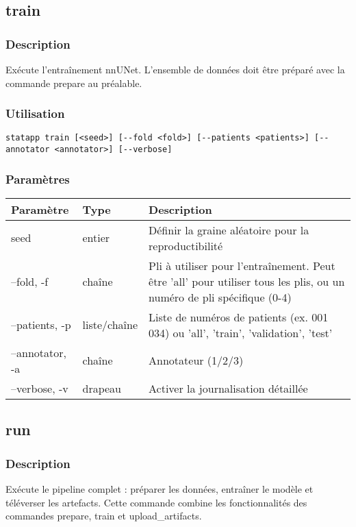 \documentclass{article}
\begin{document}
\subsection{train}
\subsubsection{Description}
Exécute l'entraînement nnUNet. L'ensemble de données doit être préparé avec la commande prepare au préalable.

\subsubsection{Utilisation}
\begin{lstlisting}
statapp train [<seed>] [--fold <fold>] [--patients <patients>] [--annotator <annotator>] [--verbose]
\end{lstlisting}

\subsubsection{Paramètres}
\begin{tabulary}{\linewidth}{LLL}
\toprule
\textbf{Paramètre} & \textbf{Type} & \textbf{Description} \\
\midrule
seed & entier & Définir la graine aléatoire pour la reproductibilité \\
--fold, -f & chaîne & Pli à utiliser pour l'entraînement. Peut être 'all' pour utiliser tous les plis, ou un numéro de pli spécifique (0-4) \\
--patients, -p & liste/chaîne & Liste de numéros de patients (ex. 001 034) ou 'all', 'train', 'validation', 'test' \\
--annotator, -a & chaîne & Annotateur (1/2/3) \\
--verbose, -v & drapeau & Activer la journalisation détaillée \\
\bottomrule
\end{tabulary}

\subsection{run}
\subsubsection{Description}
Exécute le pipeline complet : préparer les données, entraîner le modèle et téléverser les artefacts. Cette commande combine les fonctionnalités des commandes prepare, train et upload\_artifacts.
\end{document}
